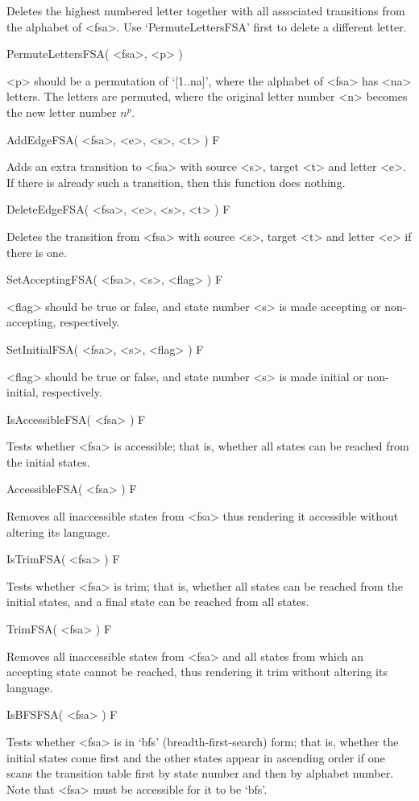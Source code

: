Deletes the highest numbered letter together with all associated transitions
from the alphabet of <fsa>. Use `PermuteLettersFSA' first to delete a
different letter.

\>PermuteLettersFSA( <fsa>, <p> )

<p> should be a permutation of `[1..na]', where the alphabet of
<fsa> has <na> letters.
The letters are permuted, where the original letter number <n> becomes
the new letter number $n^p$.

\>AddEdgeFSA( <fsa>, <e>, <s>, <t>  ) F

Adds an extra transition to <fsa> with source <s>, target <t>
and letter <e>. If there is already such a transition, then this function
does nothing.

\>DeleteEdgeFSA( <fsa>, <e>, <s>, <t>  ) F

Deletes the transition from <fsa> with source <s>, target <t>
and letter <e> if there is one.

\>SetAcceptingFSA( <fsa>, <s>, <flag> ) F

<flag> should be true or false, and state number <s> is made accepting
or non-accepting, respectively.

\>SetInitialFSA( <fsa>, <s>, <flag> ) F

<flag> should be true or false, and state number <s> is made initial
or non-initial, respectively.

\>IsAccessibleFSA( <fsa> ) F

Tests whether <fsa> is accessible; that is, whether all states can be
reached from the initial states.

\>AccessibleFSA( <fsa> ) F

Removes all inaccessible states from <fsa> thus rendering it accessible
without altering its language.

\>IsTrimFSA( <fsa> ) F

Tests whether <fsa> is trim; that is, whether all states can be
reached from the initial states, and a final state can be reached from
all states.

\>TrimFSA( <fsa> ) F

Removes all inaccessible states from <fsa> and all states from which an
accepting state cannot be reached, thus rendering it trim
without altering its language.

\>IsBFSFSA( <fsa> ) F

Tests whether <fsa> is in `bfs' (breadth-first-search) form; that is,
whether the initial states come first and the other states
appear in ascending order if one scans the transition table first
by state number and then by alphabet number. Note that <fsa> must
be accessible for it to be `bfs'.

